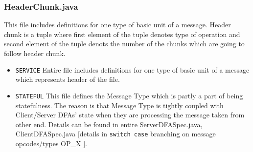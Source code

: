 \documentclass[12pt]{usenixsubmit}
\begin{document}
    \subsubsection{HeaderChunk.java}This file includes definitions for one type of basic unit of a message. Header chunk is a tuple where first element of the tuple denotes type of operation and second element of the tuple denots the number of the chunks which are going to follow header chunk.
    \begin{itemize}
    \item {\tt SERVICE} Entire file includes definitions for one type of basic unit of a message which represents header of the file.
      \item {\tt STATEFUL} This file defines the Message Type  which is partly a part of being statefulness. The reason is that Message Type is tightly coupled with Client/Server DFAs' state when they are processing the message taken from other end. Details can be found in entire ServerDFASpec.java, ClientDFASpec.java [details in {\tt switch case} branching on message opcodes/types OP\_X ].
     \end{itemize}   
\end{document}
